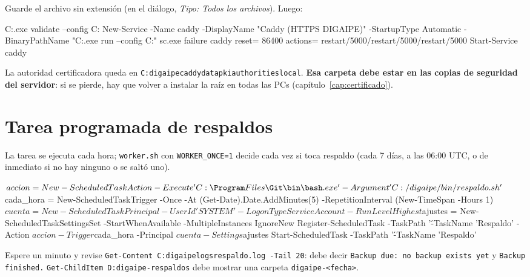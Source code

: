 Guarde el archivo sin extensión (en el diálogo, \emph{Tipo: Todos los archivos}). Luego:

\begin{codigo}
C:\digaipe\caddy\caddy.exe validate --config C:\digaipe\caddy\Caddyfile
New-Service -Name caddy -DisplayName "Caddy (HTTPS DIGAIPE)" -StartupType Automatic -BinaryPathName "C:\digaipe\caddy\caddy.exe run --config C:\digaipe\caddy\Caddyfile"
sc.exe failure caddy reset= 86400 actions= restart/5000/restart/5000/restart/5000
Start-Service caddy
\end{codigo}

La autoridad certificadora queda en
\texttt{C:\bs digaipe\bs caddy\bs data\bs pki\bs authorities\bs local}. \textbf{Esa carpeta debe
estar en las copias de seguridad del servidor}: si se pierde, hay que volver a instalar la raíz en
todas las PCs (capítulo~\ref{cap:certificado}).

\section{Tarea programada de respaldos}

La tarea se ejecuta cada hora; \texttt{worker.sh} con \texttt{WORKER\_ONCE=1} decide cada vez si
toca respaldo (cada 7 días, a las 06:00 UTC, o de inmediato si no hay ninguno o se saltó uno).

\begin{codigo}
$accion = New-ScheduledTaskAction -Execute 'C:\Program Files\Git\bin\bash.exe' -Argument 'C:/digaipe/bin/respaldo.sh'
$cada_hora = New-ScheduledTaskTrigger -Once -At (Get-Date).Date.AddMinutes(5) -RepetitionInterval (New-TimeSpan -Hours 1)
$cuenta = New-ScheduledTaskPrincipal -UserId 'SYSTEM' -LogonType ServiceAccount -RunLevel Highest
$ajustes = New-ScheduledTaskSettingsSet -StartWhenAvailable -MultipleInstances IgnoreNew
Register-ScheduledTask -TaskPath '\DIGAIPE\' -TaskName 'Respaldo' -Action $accion -Trigger $cada_hora -Principal $cuenta -Settings $ajustes
Start-ScheduledTask -TaskPath '\DIGAIPE\' -TaskName 'Respaldo'
\end{codigo}

\begin{comprobar}
	Espere un minuto y revise \texttt{Get-Content C:\bs digaipe\bs logs\bs respaldo.log -Tail 20}:
	debe decir \texttt{Backup due: no backup exists yet} y \texttt{Backup finished.}
	\texttt{Get-ChildItem D:\bs digaipe-respaldos} debe mostrar una carpeta
	\texttt{digaipe-<fecha>}.
\end{comprobar}

